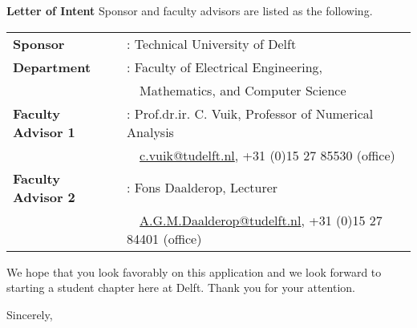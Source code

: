 \documentclass[letterpaper,12pt]{letter}
\begin{document}
\begin{letter}{\textbf{Letter of Intent}}
Sponsor and faculty advisors are listed as the following.

\begin{tabular}{ll}
\textbf{Sponsor} &: Technical University of Delft \\
\textbf{Department} &: Faculty of Electrical Engineering, \\
&\ \ Mathematics, and Computer Science \\
\textbf{Faculty Advisor 1} &: Prof.dr.ir. C. Vuik, Professor of Numerical Analysis \\
&\ \ \href{c.vuik@tudelft.nl}{c.vuik@tudelft.nl}, +31 (0)15 27 85530 (office) \\
\textbf{Faculty Advisor 2} &: Fons Daalderop, Lecturer \\
&\ \ \href{A.G.M.Daalderop@tudelft.nl}{A.G.M.Daalderop@tudelft.nl}, +31 (0)15 27 84401 (office) \\
\end{tabular}

\bigskip

We hope that you look favorably on this application and we look forward to starting a student chapter here at Delft. Thank you for your attention.

\closing{Sincerely,}


\end{letter}
\end{document}
